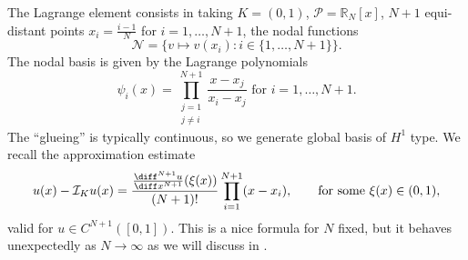 The Lagrange element consists in taking $K=(0,1)$, $\mathcal P = \mathbb R_N[x]$, $N+1$ equi-distant points $x_i = \frac{i-1}{N}$ for $i= 1, \dots, N+1$, the nodal functions
\begin{equation*}
    \mathcal N = \{ v \mapsto v(x_i) : i \in \{1, \dots, N+1\} \}.
\end{equation*}
The nodal basis is given by the Lagrange polynomials
\begin{equation*}
    \psi_i(x) = \prod_{\substack{j = 1 \\ j \ne i}}^{N+1} \frac{x - x_j}{x_i - x_j} \text{ for } i=1, \dots, N+1.
\end{equation*}
The ``glueing'' is typically continuous, so we generate global basis of $H^1$ type. We recall the approximation estimate
\begin{equation}
    \label{eq:Lagrange interpolation error estimate}
    u(x) - \mathcal I_K u(x) = \frac{\frac{\diff^{N+1}u}{\diff x^{N+1}} (\xi(x))}{(N+1)!} \prod_{i=1}^{N+1} (x - x_i), \qquad \text{for some } \xi(x) \in (0,1),
\end{equation}
valid for $u \in C^{N+1}([0,1])$.
This is a nice formula for $N$ fixed, but it behaves unexpectedly as $N \to \infty$ as we will discuss in .